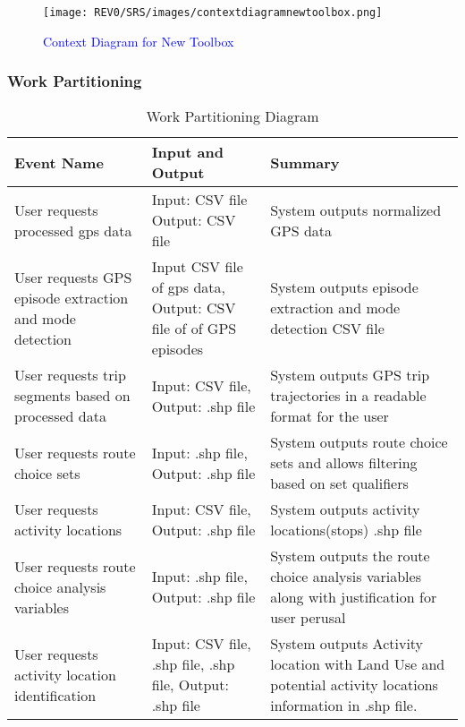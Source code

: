 \documentclass[12pt, titlepage]{article}
\begin{document}
\begin{figure}[!h]
	    \begin{center}
    	    \texttt{[image: REV0/SRS/images/contextdiagramnewtoolbox.png]}
    	    \caption{\textcolor{blue}{Context Diagram for New Toolbox}}
    	    \label{fig: Context Diagram}
    	\end{center}
\end{figure}

\subsubsection{Work Partitioning}
\begin{table}[H]
    \centering
    \begin{tabular}{|p{4cm}|p{4cm}|p{6cm}|}
         \hline
         Event Name & Input and Output & Summary\\
         \hline
         User requests processed gps data & Input: CSV file Output: CSV file & System outputs normalized GPS data\\
         \hline
         User requests GPS episode extraction and mode detection & Input CSV file of gps data, Output: CSV file of of GPS episodes & System outputs episode extraction and mode detection CSV file\\
         \hline
         User requests trip segments based on processed data & Input: CSV file, Output: .shp file & System outputs GPS trip trajectories in a readable format for the user\\
         \hline
         User requests route choice sets & Input: .shp file, Output: .shp file & System outputs route choice sets and allows filtering based on set qualifiers\\
         \hline
         User requests activity locations  & Input: CSV file, Output: .shp file & System outputs activity locations(stops) .shp file\\
         \hline
         User requests route choice analysis variables  & Input: .shp file, Output: .shp file & System outputs the route choice analysis variables along with justification for user perusal \\
         \hline
          User requests activity location identification  & Input: CSV file, .shp file, .shp file, Output: .shp file& System outputs Activity location with Land Use and potential activity locations information in .shp file. \\
         \hline
    \end{tabular}
    \caption{Work Partitioning Diagram\cite{GISBASED}}
    \label{tab:work_partitioning_diagram}
\end{table}
\end{document}
